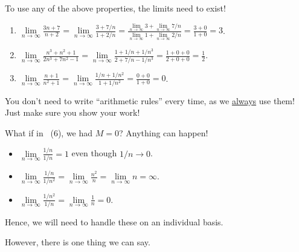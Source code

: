 \begin{Remark}{}{}
    To use any of the above properties, the limits need to exist!
\end{Remark}
\begin{Example}{}{}
    \begin{enumerate}[(1)]
        \item $ \displaystyle \lim\limits_{{n} \to {\infty}}\frac{3n+7}{n+2}
                  =\lim\limits_{{n} \to {\infty}}\frac{3+7/n}{1+2/n}
                  =\frac{\lim\limits_{{n} \to {\infty}}3+\lim\limits_{{n} \to {\infty}}7/n}{\lim\limits_{{n} \to {\infty}}1+\lim\limits_{{n} \to {\infty}}2/n}
                  =\frac{3+0}{1+0}
                  =3 $.
        \item $ \displaystyle
                  \lim\limits_{{n} \to {\infty}}\frac{n^3+n^2+1}{2n^3+7n^2-1}
                  =\lim\limits_{{n} \to {\infty}}\frac{1+1/n+1/n^3}{2+7/n-1/n^3}
                  =\frac{1+0+0}{2+0+0}
                  =\frac{1}{2} $.
        \item $ \displaystyle
                  \lim\limits_{{n} \to {\infty}}\frac{n+1}{n^2+1}
                  =\lim\limits_{{n} \to {\infty}}\frac{1/n+1/n^2}{1+1/n^2}
                  =\frac{0+0}{1+0}
                  =0 $.
    \end{enumerate}
\end{Example}
\begin{Remark}{}{}
    You don't need to write ``arithmetic rules''
    every time, as we \underline{always} use them!
    Just make sure you show your work!
\end{Remark}
\begin{Example}{}{}
    What if in~ (6), we had $ M=0 $? Anything can happen!
    \begin{itemize}
        \item $ \displaystyle \lim\limits_{{n} \to {\infty}}\frac{1/n}{1/n}=1 $
              even though $ 1/n\to 0 $.
        \item $ \displaystyle \lim\limits_{{n} \to {\infty}}\frac{1/n}{1/n^2}=
                  \lim\limits_{{n} \to {\infty}}\frac{n^2}{n}=
                  \lim\limits_{{n} \to {\infty}}n=\infty $.
        \item $ \displaystyle \lim\limits_{{n} \to {\infty}}\frac{1/n^2}{1/n}=
                  \lim\limits_{{n} \to {\infty}}\frac{1}{n}=0 $.
    \end{itemize}
    Hence, we will need to handle these on an individual basis.
\end{Example}
However, there is one thing we can say.


